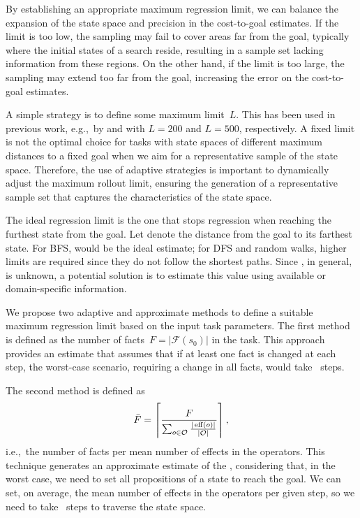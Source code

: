 By establishing an appropriate maximum regression limit, we can balance the expansion of the state space and precision in the cost-to-goal estimates. If the limit is too low, the sampling may fail to cover areas far from the goal, typically where the initial states of a search reside, resulting in a sample set lacking information from these regions. On the other hand, if the limit is too large, the sampling may extend too far from the goal, increasing the error on the cost-to-goal estimates.

A simple strategy is to define some maximum limit~$L$. This has been used in previous work, e.g.,~by \citet{yu2020learning} and \citet{otoole2022sampling} with $L=200$ and $L=500$, respectively. A fixed limit is not the optimal choice for tasks with state spaces of different maximum distances to a fixed goal when we aim for a representative sample of the state space. Therefore, the use of adaptive strategies is important to dynamically adjust the maximum rollout limit, ensuring the generation of a representative sample set that captures the characteristics of the state space.

The ideal regression limit is the one that stops regression when reaching the furthest state from the goal. Let \ssdiameter denote the distance from the goal to its farthest state. For BFS, \ssdiameter would be the ideal estimate; for DFS and random walks, higher limits are required since they do not follow the shortest paths. Since \ssdiameter, in general, is unknown, a potential solution is to estimate this value using available or domain-specific information.

We propose two adaptive and approximate methods to define a suitable maximum regression limit based on the input task parameters. The first method is defined as the number of facts~$F=|\mathcal{F}(s_0)|$ in the task. This approach provides an estimate that assumes that if at least one fact is changed at each step, the worst-case scenario, requiring a change in all facts, would take \facts~steps.

The second method is defined as~$$\bar F=\left\lceil \frac{F}{\sum_{o\in \mathcal{O}} \frac{|\operatorname{eff}(o)|}{|\mathcal{O}|}}\right\rceil,$$ i.e.,~the number of facts per mean number of effects in the operators. This technique generates an approximate estimate of the \ssdiameter, considering that, in the worst case, we need to set all propositions of a state to reach the goal. We can set, on average, the mean number of effects in the operators per given step, so we need to take \meanfx~steps to traverse the state space.

